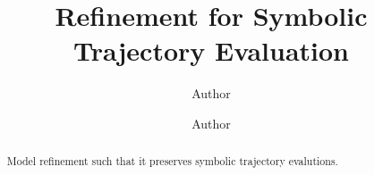 \documentclass[runningheads]{llncs}
\begin{document}
\title{Refinement for Symbolic Trajectory Evaluation}


\author{Author \and Author}



\maketitle %

\begin{abstract}
Model refinement such that it preserves symbolic trajectory evalutions.

\end{abstract}




%
%

\appendix





\end{document}
